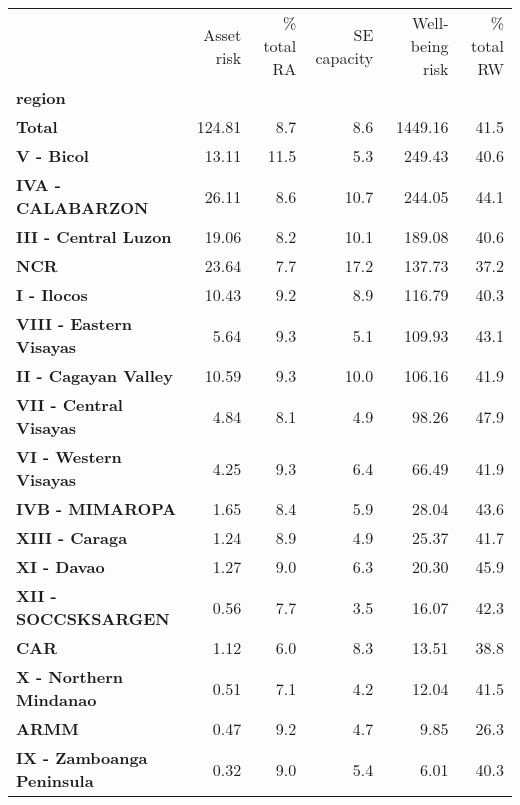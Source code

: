 \begin{tabular}{lrrrrr}
\toprule
{} &  Asset risk &  \% total RA &  SE capacity &  Well-being risk &  \% total RW \\
\textbf{region                  } &             &             &              &                  &             \\
\midrule
\textbf{Total                   } &      124.81 &         8.7 &          8.6 &          1449.16 &        41.5 \\
\textbf{V - Bicol               } &       13.11 &        11.5 &          5.3 &           249.43 &        40.6 \\
\textbf{IVA - CALABARZON        } &       26.11 &         8.6 &         10.7 &           244.05 &        44.1 \\
\textbf{III - Central Luzon     } &       19.06 &         8.2 &         10.1 &           189.08 &        40.6 \\
\textbf{NCR                     } &       23.64 &         7.7 &         17.2 &           137.73 &        37.2 \\
\textbf{I - Ilocos              } &       10.43 &         9.2 &          8.9 &           116.79 &        40.3 \\
\textbf{VIII - Eastern Visayas  } &        5.64 &         9.3 &          5.1 &           109.93 &        43.1 \\
\textbf{II - Cagayan Valley     } &       10.59 &         9.3 &         10.0 &           106.16 &        41.9 \\
\textbf{VII - Central Visayas   } &        4.84 &         8.1 &          4.9 &            98.26 &        47.9 \\
\textbf{VI - Western Visayas    } &        4.25 &         9.3 &          6.4 &            66.49 &        41.9 \\
\textbf{IVB - MIMAROPA          } &        1.65 &         8.4 &          5.9 &            28.04 &        43.6 \\
\textbf{XIII - Caraga           } &        1.24 &         8.9 &          4.9 &            25.37 &        41.7 \\
\textbf{XI - Davao              } &        1.27 &         9.0 &          6.3 &            20.30 &        45.9 \\
\textbf{XII - SOCCSKSARGEN      } &        0.56 &         7.7 &          3.5 &            16.07 &        42.3 \\
\textbf{CAR                     } &        1.12 &         6.0 &          8.3 &            13.51 &        38.8 \\
\textbf{X - Northern Mindanao   } &        0.51 &         7.1 &          4.2 &            12.04 &        41.5 \\
\textbf{ARMM                    } &        0.47 &         9.2 &          4.7 &             9.85 &        26.3 \\
\textbf{IX - Zamboanga Peninsula} &        0.32 &         9.0 &          5.4 &             6.01 &        40.3 \\
\bottomrule
\end{tabular}
